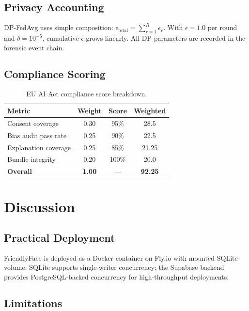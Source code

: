 \documentclass[conference]{IEEEtran}
\begin{document}
\subsection{Privacy Accounting}

DP-FedAvg uses simple composition: $\epsilon_{\text{total}} = \sum_{r=1}^{R} \epsilon_r$. With $\epsilon = 1.0$ per round and $\delta = 10^{-5}$, cumulative $\epsilon$ grows linearly. All DP parameters are recorded in the forensic event chain.

\subsection{Compliance Scoring}

\begin{table}[h]
\centering
\caption{EU AI Act compliance score breakdown.}
\label{tab:compliance}
\begin{tabular}{lccc}
\toprule
\textbf{Metric} & \textbf{Weight} & \textbf{Score} & \textbf{Weighted} \\
\midrule
Consent coverage & 0.30 & 95\% & 28.5 \\
Bias audit pass rate & 0.25 & 90\% & 22.5 \\
Explanation coverage & 0.25 & 85\% & 21.25 \\
Bundle integrity & 0.20 & 100\% & 20.0 \\
\midrule
\textbf{Overall} & \textbf{1.00} & --- & \textbf{92.25} \\
\bottomrule
\end{tabular}
\end{table}

\section{Discussion}

\subsection{Practical Deployment}

FriendlyFace is deployed as a Docker container on Fly.io with mounted SQLite volume. SQLite supports single-writer concurrency; the Supabase backend provides PostgreSQL-backed concurrency for high-throughput deployments.

\subsection{Limitations}
\end{document}
